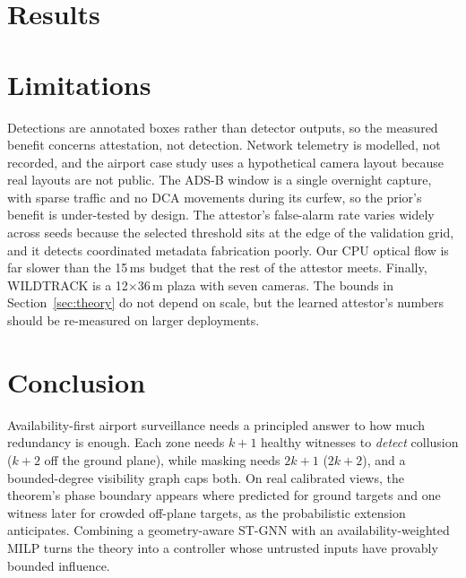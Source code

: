 \documentclass[journal]{IEEEtran}
\theoremstyle{remark}
\begin{document}
\section{Results}\label{sec:results}


\section{Limitations}
Detections are annotated boxes rather than detector outputs, so the measured benefit concerns attestation, not
detection. Network telemetry is modelled, not recorded, and the airport case study uses a hypothetical camera layout
because real layouts are not public. The ADS-B window is a single overnight capture, with sparse traffic and no DCA
movements during its curfew, so the prior's benefit is under-tested by design. The attestor's false-alarm rate varies
widely across seeds because the selected threshold sits at the edge of the validation grid, and it detects
coordinated metadata fabrication poorly. Our CPU optical flow is far slower than the 15\,ms budget that the rest of the
attestor meets. Finally, WILDTRACK is a 12$\times$36\,m
plaza with seven cameras. The bounds in Section~\ref{sec:theory} do not depend on scale, but the learned attestor's
numbers should be re-measured on larger deployments.

\section{Conclusion}
Availability-first airport surveillance needs a principled answer to how much redundancy is enough. Each zone needs
$k{+}1$ healthy witnesses to \emph{detect} collusion ($k{+}2$ off the ground plane), while masking needs $2k{+}1$
($2k{+}2$), and a bounded-degree visibility graph caps both. On real calibrated views, the theorem's phase boundary
appears where predicted for ground targets and one witness later for crowded off-plane targets, as the probabilistic
extension anticipates. Combining a geometry-aware ST-GNN with an availability-weighted MILP turns the theory into a
controller whose untrusted inputs have provably bounded influence.



\end{document}
